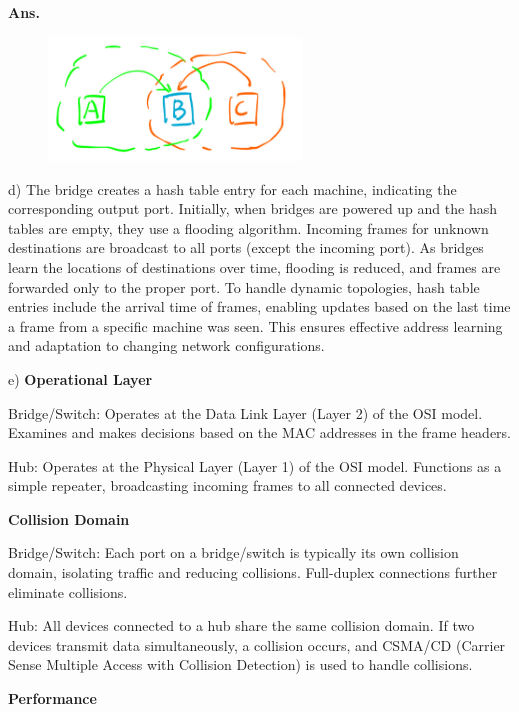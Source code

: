 \documentclass[12pt, a4paper, UTF8, fontset=windows]{ctexbook}
\newenvironment{solution}{\par\noindent\textbf{Ans.}}{\par}
\begin{document}
\begin{solution}
    \begin{figure}[H]
        \centering
        \includegraphics[width=0.6\textwidth]{../src/Q2-c.png}
    \end{figure}

    d)
    The bridge creates a hash table entry for each machine, indicating the corresponding output port. Initially, when bridges are powered up and the hash tables are empty, they use a flooding algorithm. Incoming frames for unknown destinations are broadcast to all ports (except the incoming port). As bridges learn the locations of destinations over time, flooding is reduced, and frames are forwarded only to the proper port. To handle dynamic topologies, hash table entries include the arrival time of frames, enabling updates based on the last time a frame from a specific machine was seen. This ensures effective address learning and adaptation to changing network configurations.

    e)
    \textbf{Operational Layer}

        Bridge/Switch: Operates at the Data Link Layer (Layer 2) of the OSI model. Examines and makes decisions based on the MAC addresses in the frame headers.
    
        Hub: Operates at the Physical Layer (Layer 1) of the OSI model. Functions as a simple repeater, broadcasting incoming frames to all connected devices.

    \textbf{Collision Domain}

        Bridge/Switch: Each port on a bridge/switch is typically its own collision domain, isolating traffic and reducing collisions. Full-duplex connections further eliminate collisions.
        
        Hub: All devices connected to a hub share the same collision domain. If two devices transmit data simultaneously, a collision occurs, and CSMA/CD (Carrier Sense Multiple Access with Collision Detection) is used to handle collisions.

    \textbf{Performance}


\end{solution}
\end{document}
